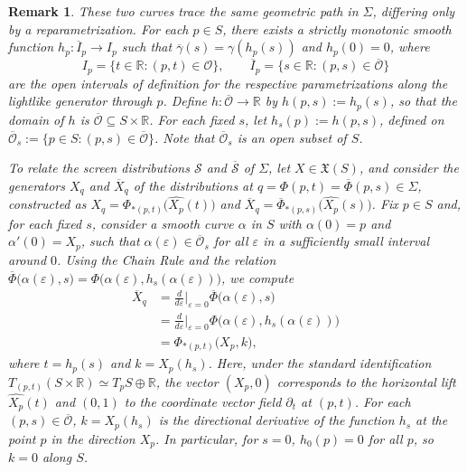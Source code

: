 \documentclass[11pt]{article}
\numberwithin{equation}{section}
\newtheorem{remark}[theorem]{Remark}
\begin{document}
\begin{remark}
	These two curves trace the same geometric path in $\Sigma$, differing only by a reparametrization. 
	For each $p \in S$, there exists a strictly monotonic smooth function $h_p\colon \overline{I}_p \to I_p$ such that $\overline{\gamma}(s) = \gamma(h_p(s))$ and $h_p(0)=0$, where
	\[
	I_p = \{ t \in \mathbb{R} : (p, t) \in \mathscr{O} \}, \qquad \overline{I}_p = \{ s \in \mathbb{R} : (p, s) \in \overline{\mathscr{O}} \}
	\]
	are the open intervals of definition for the respective parametrizations along the lightlike generator through $p$. Define $h\colon \overline{\mathscr{O}} \to \mathbb{R}$ by $h(p, s) := h_p(s)$, so that the domain of $h$ is $\overline{\mathscr{O}} \subseteq S \times \mathbb{R}$. 
	For each fixed $s$, let $h_s(p) := h(p, s)$, defined on $\overline{\mathscr{O}}_s := \{ p \in S : (p, s) \in \overline{\mathscr{O}} \}$. Note that $\overline{\mathscr{O}}_s$ is an open subset of $S$.
	
To relate the screen distributions $\mathcal{S}$ and $\overline{\mathcal{S}}$ of $\Sigma$, let $X \in \mathfrak{X}(S)$, and consider the generators $X_q$ and $\overline{X}_q$ of the distributions at $q = \Phi(p, t) = \overline{\Phi}(p, s) \in \Sigma$, constructed as $X_q = \Phi_{*(p, t)}\bigl(\widehat{X_p}(t)\bigr)$ and $\overline{X}_q = \overline{\Phi}_{*(p, s)}\bigl(\widehat{X_p}(s)\bigr)$. Fix $p \in S$ and, for each fixed $s$, consider a smooth curve $\alpha$ in $S$ with $\alpha(0) = p$ and $\alpha'(0) = X_p$, such that $\alpha(\varepsilon) \in \overline{\mathscr{O}}_s$ for all $\varepsilon$ in a sufficiently small interval around $0$. Using the Chain Rule and the relation $\overline{\Phi}\bigl(\alpha(\varepsilon), s\bigr) = \Phi\bigl(\alpha(\varepsilon), h_s(\alpha(\varepsilon))\bigr)$, we compute
\begin{align*}
	\overline{X}_q &= \frac{d}{d\varepsilon}\bigg|_{\varepsilon=0} \overline{\Phi}\bigl(\alpha(\varepsilon), s\bigr) \\
	&= \frac{d}{d\varepsilon}\bigg|_{\varepsilon=0} \Phi\bigl(\alpha(\varepsilon), h_s(\alpha(\varepsilon))\bigr) \\
	&= \Phi_{*(p,t)} \bigl(X_p, k\bigr),
\end{align*}
where $t = h_p(s)$ and $k = X_p(h_s)$. Here, under the standard identification $T_{(p, t)}(S \times \mathbb{R}) \simeq T_pS \oplus \mathbb{R}$, the vector $(X_p, 0)$ corresponds to the horizontal lift $\widehat{X_p}(t)$ and $(0, 1)$ to the coordinate vector field $\partial_t$ at $(p, t)$. For each $(p, s)\in \overline{\mathscr{O}}$, $k = X_p(h_s)$ is the directional derivative of the function $h_s$ at the point $p$ in the direction $X_p$. In particular, for $s = 0$, $h_0(p) = 0$ for all $p$, so $k = 0$ along $S$.


\end{remark}
\end{document}
